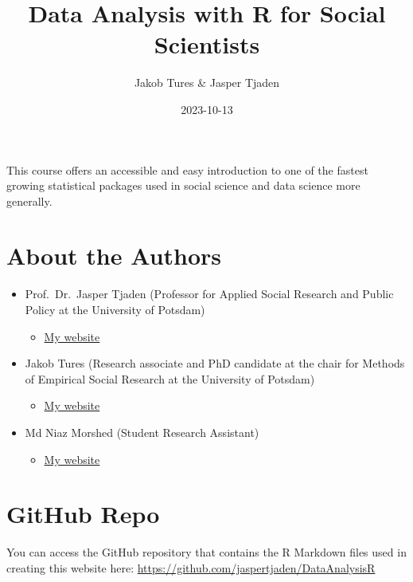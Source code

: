 \documentclass[
]{book}
\title{Data Analysis with R for Social Scientists}
\author{Jakob Tures \& Jasper Tjaden}
\date{2023-10-13}
\providecommand{\tightlist}{%
  \setlength{\itemsep}{0pt}\setlength{\parskip}{0pt}}
\begin{document}
\maketitle

{
\setcounter{tocdepth}{1}
\tableofcontents
}
This course offers an accessible and easy introduction to one of the fastest growing statistical packages used in social science and data science more generally.

\hypertarget{about-the-authors}{%
\chapter*{About the Authors}\label{about-the-authors}}

\begin{itemize}
\tightlist
\item
  Prof.~Dr.~Jasper Tjaden (Professor for Applied Social Research and Public Policy at the University of Potsdam)

  \begin{itemize}
  \tightlist
  \item
    \href{https://jaspertjaden.com}{My website}
  \end{itemize}
\item
  Jakob Tures (Research associate and PhD candidate at the chair for Methods of Empirical Social Research at the University of Potsdam)

  \begin{itemize}
  \tightlist
  \item
    \href{https://www.uni-potsdam.de/de/soziologie-methoden/team/jakob-tures}{My website}
  \end{itemize}
\item
  Md Niaz Morshed (Student Research Assistant)

  \begin{itemize}
  \tightlist
  \item
    \href{https://n1az.github.io/}{My website}
  \end{itemize}
\end{itemize}

\hypertarget{github-repo}{%
\chapter{GitHub Repo}\label{github-repo}}

You can access the GitHub repository that contains the R Markdown files used in creating this website here: \url{https://github.com/jaspertjaden/DataAnalysisR}
\end{document}

